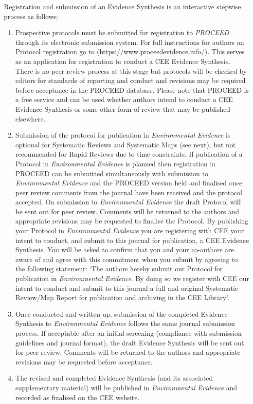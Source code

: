 \documentclass[
  letterpaper,
  DIV=11,
  numbers=noendperiod]{scrreprt}
\begin{document}
Registration and submission of an Evidence Synthesis is an interactive
stepwise process as follows;

\begin{enumerate}
\def\labelenumi{\arabic{enumi}.}
\item
  Prospective protocols must be submitted for registration to
  \emph{PROCEED} through its electronic submission system. For full
  instructions for authors on Protocol registration go to
  (https://www.proceedevidence.info/). This serves as an application for
  registration to conduct a CEE Evidence Synthesis. There is no peer
  review process at this stage but protocols will be checked by editors
  for standards of reporting and conduct and revisions may be required
  before acceptance in the PROCEED database. Please note that PROCEED is
  a free service and can be used whether authors intend to conduct a CEE
  Evidence Synthesis or some other form of review that may be published
  elsewhere.
\item
  Submission of the protocol for publication in \emph{Environmental
  Evidence} is optional for Systematic Reviews and Systematic Maps (see
  next), but not recommended for Rapid Reviews due to time constraints.
  If publication of a Protocol in \emph{Environmental Evidence} is
  planned then registration in PROCEED can be submitted simultaneously
  with submission to \emph{Environmental Evidence} and the PROCEED
  version held and finalised once peer review comments from the journal
  have been received and the protocol accepted. On submission to
  \emph{Environmental Evidence} the draft Protocol will be sent out for
  peer review. Comments will be returned to the authors and appropriate
  revisions may be requested to finalise the Protocol. By publishing
  your Protocol in \emph{Environmental Evidence} you are registering
  with CEE your intent to conduct, and submit to this journal for
  publication, a CEE Evidence Synthesis. You will be asked to confirm
  that you and your co-authors are aware of and agree with this
  commitment when you submit by agreeing to the following statement:
  `The authors hereby submit our Protocol for publication in
  \emph{Environmental Evidence}. By doing so we register with CEE our
  intent to conduct and submit to this journal a full and original
  Systematic Review/Map Report for publication and archiving in the CEE
  Library'.
\item
  Once conducted and written up, submission of the completed Evidence
  Synthesis to \emph{Environmental Evidence} follows the same journal
  submission process. If acceptable after an initial screening
  (compliance with submission guidelines and journal format), the draft
  Evidence Synthesis will be sent out for peer review. Comments will be
  returned to the authors and appropriate revisions may be requested
  before acceptance.
\item
  The revised and completed Evidence Synthesis (and its associated
  supplementary material) will be published in \emph{Environmental
  Evidence} and recorded as finalised on the CEE website.
\end{enumerate}
\end{document}
